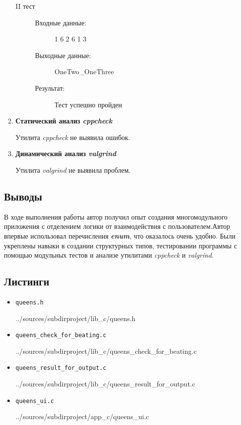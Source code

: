 \documentclass[12pt,a4paper]{report}
\begin{document}
\begin{enumerate}
\begin{description}
\item[II тест]
\hspace{\parindent}
\begin{flushleft}
\begin{description}
\item[Входные данные:] 1 6 2 6 1 3
\item[Выходные данные:] OneTwo\_OneThree
\item[Результат:] Тест успешно пройден
\end{description}
\end{flushleft}
\end{description}

\item \textbf{Статический анализ \textit{cppcheck}}

Утилита \textit{cppcheck} не выявила ошибок.

\item \textbf{Динамический анализ \textit{valgrind}}

Утилита \textit{valgrind} не выявила проблем.
\end{enumerate}

\subsection{Выводы}
В ходе выполнения работы автор получил опыт создания многомодульного приложения с отделением логики от взаимодействия с пользователем.Автор впервые использовал перечисления \textit{\textbf{enum}}, что оказалось очень удобно. Были укреплены навыки в создании структурных типов, тестировании программы с помощью модульных тестов и анализе утилитами \textit{cppcheck} и \textit{valgrind}.
\subsection*{Листинги}
\begin{itemize}
\item[] \verb-queens.h-

{../sources/subdirproject/lib_c/queens.h}
\item[] \verb-queens_check_for_beating.c-

{../sources/subdirproject/lib_c/queens_check_for_beating.c}
\item[] \verb-queens_result_for_output.c-

{../sources/subdirproject/lib_c/queens_result_for_output.c}
\item[] \verb-queens_ui.c-

{../sources/subdirproject/app_c/queens_ui.c}
\end{itemize}
%
\end{document}
